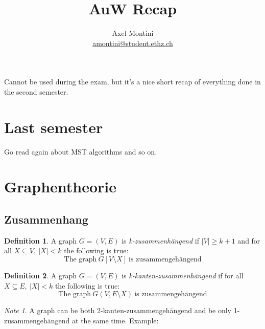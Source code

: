 \documentclass[12pt]{extarticle}
\title{AuW Recap}
\author{
    Axel Montini
    \\
    \href{mailto:amontini@student.ethz.ch}{amontini@student.ethz.ch}
}
\theoremstyle{definition}
\newtheorem{definition}{Definition}
\theoremstyle{remark}
\newtheorem{note}{Note}
\theoremstyle{plain}
\begin{document}
\maketitle

Cannot be used during the exam, but it's a nice short recap of everything done in the second semester.

\section{Last semester}
Go read again about MST algorithms and so on.

\section{Graphentheorie}

\subsection{Zusammenhang}
\begin{definition}
    A graph $G=(V,E)$ is \textit{k-zusammenhängend} if $|V| \ge k + 1$ and
    for all $X \subseteq V,\ |X| < k$ the following is true:
    \[ \mbox{The graph}\ G[V \setminus X]\ \mbox{is zusammengehängend} \]
\end{definition}

\begin{definition}
    A graph $G=(V,E)$ is \textit{k-kanten-zusammenhängend} if
    for all $X \subseteq E,\ |X| < k$ the following is true:
    \[ \mbox{The graph}\ G(V, E \setminus X)\ \mbox{is zusammengehängend} \]
\end{definition}

\begin{note}
    A graph can be both 2-kanten-zusammengehängend and be only 1-zusammengehängend at the same time.
    Example:
    \begin{figure}[H]
        \centering

    \end{figure}
\end{note}
\end{document}
